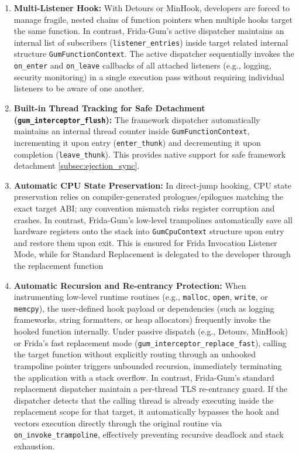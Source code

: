 \begin{enumerate}
	\item \textbf{Multi-Listener Hook:} With Detours or MinHook, developers are forced to manage fragile, nested chains of function pointers when multiple hooks target the same function. In contrast, Frida-Gum's active dispatcher maintains an internal list of subscribers (\texttt{listener\_entries}) inside target related internal structure \texttt{GumFunctionContext}. The active dispatcher sequentially invokes the \texttt{on\_enter} and \texttt{on\_leave} callbacks of all attached listeners (e.g., logging, security monitoring) in a single execution pass without requiring individual listeners to be aware of one another.
	
	\item \textbf{Built-in Thread Tracking for Safe Detachment (\texttt{gum\_interceptor\_flush}):} The framework dispatcher automatically maintains an internal thread counter inside \texttt{GumFunctionContext}, incrementing it upon entry (\texttt{enter\_thunk}) and decrementing it upon completion (\texttt{leave\_thunk}). This provides native support for safe framework detachment \cref{subsec:ejection_sync}.
	
	\item \textbf{Automatic CPU State Preservation:} In direct-jump hooking, CPU state preservation relies on compiler-generated prologues/epilogues matching the exact target ABI; any convention mismatch risks register corruption and crashes. In contrast, Frida-Gum's low-level trampolines automatically save all hardware registers onto the stack into \texttt{GumCpuContext} structure upon entry and restore them upon exit. This is ensured for Frida Invocation Listener Mode, while for Standard Replacement is delegated to the developer through the replacement function
	
	\item \textbf{Automatic Recursion and Re-entrancy Protection:} When instrumenting low-level runtime routines (e.g., \texttt{malloc}, \texttt{open}, \texttt{write}, or \texttt{memcpy}), the user-defined hook payload or dependencies (such as logging frameworks, string formatters, or heap allocators) frequently invoke the hooked function internally. Under passive dispatch (e.g., Detours, MinHook) or Frida's fast replacement mode (\texttt{gum\_interceptor\_replace\_fast}), calling the target function without explicitly routing through an unhooked trampoline pointer triggers unbounded recursion, immediately terminating the application with a stack overflow. In contrast, Frida-Gum's standard replacement dispatcher maintain a per-thread \ac{TLS} re-entrancy guard. If the dispatcher detects that the calling thread is already executing inside the replacement scope for that target, it automatically bypasses the hook and vectors execution directly through the original routine via \texttt{on\_invoke\_trampoline}, effectively preventing recursive deadlock and stack exhaustion.
\end{enumerate}

